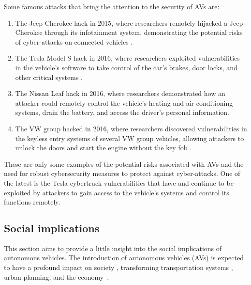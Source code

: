 Some famous attacks that bring the attention to the security of AVs are:
\begin{enumerate}
    \item The Jeep Cherokee hack in 2015, where researchers remotely hijacked a Jeep Cherokee through its infotainment system, demonstrating the potential risks of cyber-attacks on connected vehicles \cite{miller2015remote} .
    \item The Tesla Model S hack in 2016, where researchers exploited vulnerabilities in the vehicle's software to take control of the car's brakes, door locks, and other critical systems \cite{tesla_hack}.
    \item The Nissan Leaf hack in 2016, where researchers demonstrated how an attacker could remotely control the vehicle's heating and air conditioning systems, drain the battery, and access the driver's personal information.
    \item The VW group hacked in 2016, where researchers discovered vulnerabilities in the keyless entry systems of several VW group vehicles, allowing attackers to unlock the doors and start the engine without the key fob \cite{garcia2016lock}.
\end{enumerate}

These are only some examples of the potential risks associated with AVs and the need for robust cybersecurity measures to protect against cyber-attacks.
One of the latest is the Tesla cybertruck vulnerabilities that have and continue to be exploited by attackers to gain access to the vehicle's systems and control its functions remotely.

\subsection{Social implications}\label{subsec:social-implications}

This section aims to provide a little insight into the social implications of autonomous vehicles.
The introduction of autonomous vehicles (AVs) is expected to have a profound impact on society \cite{thomas2020perception}, transforming transportation systems \cite{intelligent_transportation_2023}
, urban planning\cite{impact_autonomous_vehicles_2018}, and the economy~\cite{economic_aspects_2020}.

